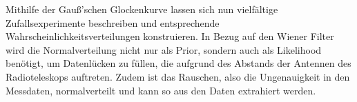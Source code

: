 Mithilfe der Gauß'schen Glockenkurve lassen sich nun vielfältige Zufallsexperimente beschreiben und entsprechende Wahrscheinlichkeitsverteilungen konstruieren. In Bezug auf den Wiener Filter wird die Normalverteilung nicht nur als Prior, sondern auch als Likelihood benötigt, um Datenlücken zu füllen, die aufgrund des Abstands der Antennen des Radioteleskops auftreten. Zudem ist das Rauschen, also die Ungenauigkeit in den Messdaten, normalverteilt und kann so aus den Daten extrahiert werden.
